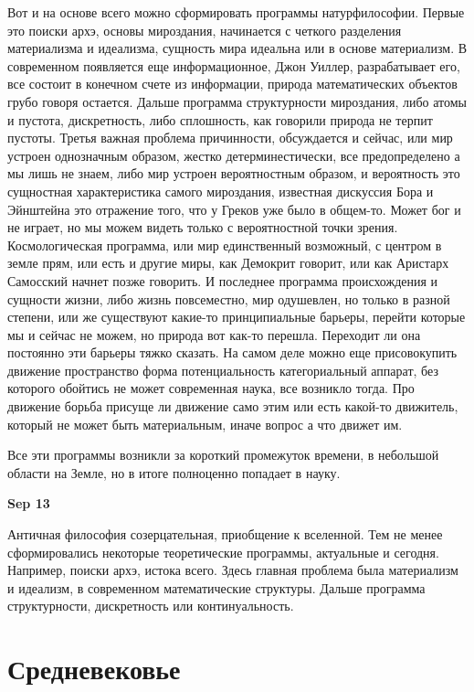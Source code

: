 \documentclass[a4paper, 12pt]{article}
\begin{document}
Вот и на основе всего можно сформировать программы натурфилософии. 
Первые это поиски архэ, основы мироздания, начинается с четкого 
разделения материализма и идеализма, сущность мира идеальна или в основе 
материализм. В современном появляется еще информационное, Джон Уиллер, 
разрабатывает его, все состоит в конечном счете из информации, природа 
математических объектов грубо говоря остается. Дальше программа 
структурности мироздания, либо атомы и пустота, дискретность, либо 
сплошность, как говорили природа не терпит пустоты. Третья важная 
проблема причинности, обсуждается и сейчас, или мир устроен однозначным 
образом, жестко детерминестически, все предопределено а мы лишь не 
знаем, либо мир устроен вероятностным образом, и вероятность это 
сущностная характеристика самого мироздания, известная дискуссия Бора 
и Эйнштейна это отражение того, что у Греков уже было в общем-то. Может 
бог и не играет, но мы можем видеть только с вероятностной точки зрения. 
Космологическая программа, или мир единственный возможный, с центром 
в земле прям, или есть и другие миры, как Демокрит говорит, или как 
Аристарх Самосский начнет позже говорить. И последнее программа 
происхождения и сущности жизни, либо жизнь повсеместно, мир одушевлен, 
но только в разной степени, или же существуют какие-то принципиальные 
барьеры, перейти которые мы и сейчас не можем, но природа вот как-то 
перешла. Переходит ли она постоянно эти барьеры тяжко сказать. На самом 
деле можно еще присовокупить движение пространство форма потенциальность 
категориальный аппарат, без которого обойтись не может современная 
наука, все возникло тогда. Про движение борьба присуще ли движение само 
этим или есть какой-то движитель, который не может быть материальным, 
иначе вопрос а что движет им.

Все эти программы возникли за короткий промежуток времени, в небольшой 
области на Земле, но в итоге полноценно попадает в науку.

\hfill \textbf{Sep 13}

Античная философия созерцательная, приобщение к вселенной. Тем не менее 
сформировались некоторые теоретические программы, актуальные и сегодня. 
Например, поиски архэ, истока всего. Здесь главная проблема была 
материализм и идеализм, в современном математические структуры. Дальше 
программа структурности, дискретность или континуальность.


\section{Средневековье}
\end{document}
